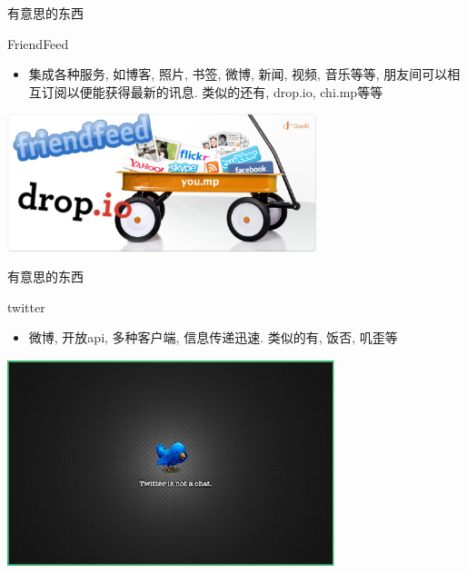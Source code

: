 \documentclass[dvipdfm]{beamer}
\begin{document}
\begin{frame}[t]{有意思的东西}
  \begin{block}{FriendFeed}
    \begin{itemize}
    \item 集成各种服务, 如博客, 照片, 书签, 微博, 新闻, 视频, 音乐等等, 朋友间可以相互订阅以便能获得最新的讯息. 类似的还有, drop.io, chi.mp等等 
    \end{itemize}
  \end{block}
  \begin{center}
  \centering \includegraphics[height=4cm]{figure/ff.eps}
  \end{center}
\end{frame}

\begin{frame}[t]{有意思的东西}
  \begin{block}{twitter}
    \begin{itemize}
    \item 微博, 开放api, 多种客户端, 信息传递迅速. 类似的有, 饭否, 叽歪等
    \end{itemize}
  \end{block}
  \begin{center}
  \centering \includegraphics[height=6cm]{figure/twitterw.eps}
  \end{center}
\end{frame}
\end{document}
